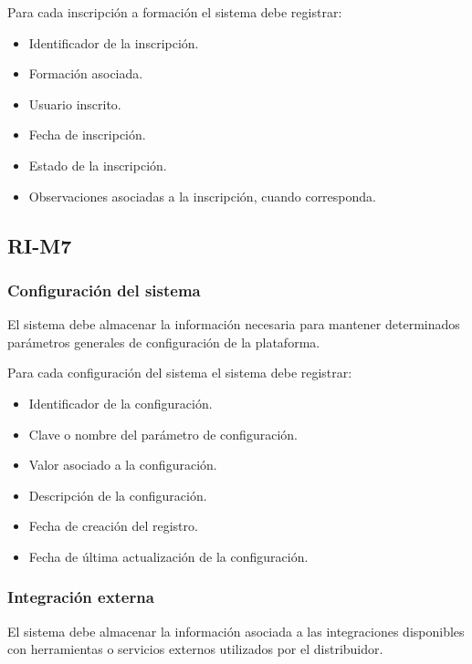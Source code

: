 Para cada inscripción a formación el sistema debe registrar:

\begin{itemize}
    \item Identificador de la inscripción.
    \item Formación asociada.
    \item Usuario inscrito.
    \item Fecha de inscripción.
    \item Estado de la inscripción.
    \item Observaciones asociadas a la inscripción, cuando corresponda.
\end{itemize}

\subsection{RI-M7}

\subsubsection*{Configuración del sistema}

El sistema debe almacenar la información necesaria para mantener determinados parámetros generales de configuración de la plataforma.

Para cada configuración del sistema el sistema debe registrar:

\begin{itemize}
    \item Identificador de la configuración.
    \item Clave o nombre del parámetro de configuración.
    \item Valor asociado a la configuración.
    \item Descripción de la configuración.
    \item Fecha de creación del registro.
    \item Fecha de última actualización de la configuración.
\end{itemize}

\subsubsection*{Integración externa}

El sistema debe almacenar la información asociada a las integraciones disponibles con herramientas o servicios externos utilizados por el distribuidor.


